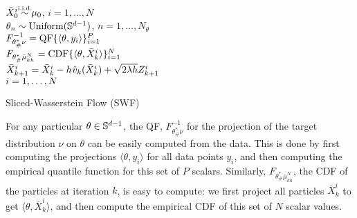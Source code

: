      \begin{algorithm2e}[t]
         \SetInd{0.1ex}{1.5ex}
         \DontPrintSemicolon
         {\color{purple} \small {}}
         $\bar{X}_0^i \simiid \mu_0$, \hfill $i = 1,\dots,N$\\
     {\color{purple} \small {}}
     $\theta_{n} \sim \mathrm{Uniform}(\mathbb{S}^{d-1})$, \hfill $n = 1,\dots,N_\theta$\\
     {\color{purple} \small {}}
     {
     $F^{-1}_{\theta^*_\#\nu}=\textnormal{QF}\{\langle\theta,y_i \rangle\}_{i=1}^P$\\
     }
     {\color{purple} \small {}}
     {
        {
        {\color{purple} \small {}}
        $F_{\theta^*_\#\bar{\mu}_{kh}^{N}}=\textnormal{CDF}\{\langle\theta,\bar{X}_k^i \rangle\}_{i=1}^N$\\
        }
        {\color{purple} \small {}}
        $\bar{X}_{k+1}^i = \bar{X}_{k}^i - h \hspace{0.5pt} \hat{v}_k(\bar{X}^i_k) + \sqrt{2 \lambda h} Z^i_{k+1}$ \vspace{2pt} \\
        $\hfill i = 1,\dots,N$
     }
         \caption{Sliced-Wasserstein Flow (SWF)}
         \label{algo:flow}
     \end{algorithm2e}

For any particular $\theta\in\mathbb{S}^{d-1}$, the QF, $F_{\theta^*_\#\nu}^{-1}$ for the projection of the target distribution $\nu$ on $\theta$ can be easily computed from the data. This is done by first computing the projections $\langle \theta, y_i\rangle$ for all data points $y_i$, and then computing the empirical quantile function for this set of $P$ scalars.
%
Similarly, $F_{\theta^*_\#\bar{\mu}_{kh}^{N}}$, the CDF of the particles at iteration $k$, is easy to compute: we first project all particles $\bar{X}_k^i$ to get $\langle \theta, \bar{X}_k^i\rangle$, and then compute the empirical CDF of this set of $N$ scalar values.

